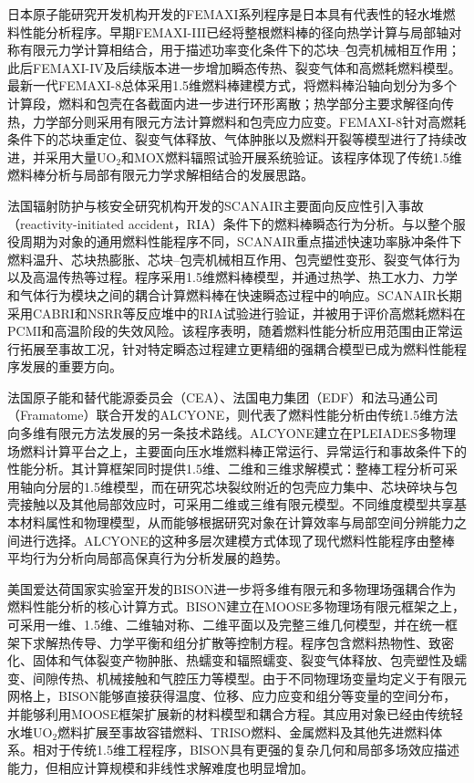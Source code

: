 日本原子能研究开发机构开发的FEMAXI系列程序是日本具有代表性的轻水堆燃料性能分析程序。早期FEMAXI-III已经将整根燃料棒的径向热学计算与局部轴对称有限元力学计算相结合，用于描述功率变化条件下的芯块--包壳机械相互作用；此后FEMAXI-IV及后续版本进一步增加瞬态传热、裂变气体和高燃耗燃料模型。最新一代FEMAXI-8总体采用1.5维燃料棒建模方式，将燃料棒沿轴向划分为多个计算段，燃料和包壳在各截面内进一步进行环形离散；热学部分主要求解径向传热，力学部分则采用有限元方法计算燃料和包壳应力应变\cite{udagawaModelUpdatesFEMAXI2019}。FEMAXI-8针对高燃耗条件下的芯块重定位、裂变气体释放、气体肿胀以及燃料开裂等模型进行了持续改进，并采用大量UO$_2$和MOX燃料辐照试验开展系统验证。该程序体现了传统1.5维燃料棒分析与局部有限元力学求解相结合的发展思路。

法国辐射防护与核安全研究机构开发的SCANAIR主要面向反应性引入事故（re\-ac\-tiv\-i\-ty-initiated accident，RIA）条件下的燃料棒瞬态行为分析。与以整个服役周期为对象的通用燃料性能程序不同，SCANAIR重点描述快速功率脉冲条件下燃料温升、芯块热膨胀、芯块--包壳机械相互作用、包壳塑性变形、裂变气体行为以及高温传热等过程。程序采用1.5维燃料棒模型，并通过热学、热工水力、力学和气体行为模块之间的耦合计算燃料棒在快速瞬态过程中的响应\cite{moalSCANAIRTransientFuel2014}。SCANAIR长期采用CABRI和NSRR等反应堆中的RIA试验进行验证，并被用于评价高燃耗燃料在PCMI和高温阶段的失效风险。该程序表明，随着燃料性能分析应用范围由正常运行拓展至事故工况，针对特定瞬态过程建立更精细的强耦合模型已成为燃料性能程序发展的重要方向。

法国原子能和替代能源委员会（CEA）、法国电力集团（EDF）和法马通公司（Framatome）联合开发的ALCYONE，则代表了燃料性能分析由传统1.5维方法向多维有限元方法发展的另一条技术路线。ALCYONE建立在PLEIADES多物理场燃料计算平台之上，主要面向压水堆燃料棒正常运行、异常运行和事故条件下的性能分析\cite{introiniALCYONEFuelPerformance2024}。其计算框架同时提供1.5维、二维和三维求解模式：整棒工程分析可采用轴向分层的1.5维模型，而在研究芯块裂纹附近的包壳应力集中、芯块碎块与包壳接触以及其他局部效应时，可采用二维或三维有限元模型。不同维度模型共享基本材料属性和物理模型，从而能够根据研究对象在计算效率与局部空间分辨能力之间进行选择。ALCYONE的这种多层次建模方式体现了现代燃料性能程序由整棒平均行为分析向局部高保真行为分析发展的趋势。

美国爱达荷国家实验室开发的BISON进一步将多维有限元和多物理场强耦合作为燃料性能分析的核心计算方式。BISON建立在MOOSE多物理场有限元框架之上，可采用一维、1.5维、二维轴对称、二维平面以及完整三维几何模型，并在统一框架下求解热传导、力学平衡和组分扩散等控制方程\cite{williamsonBISONFlexibleCode2021}。程序包含燃料热物性、致密化、固体和气体裂变产物肿胀、热蠕变和辐照蠕变、裂变气体释放、包壳塑性及蠕变、间隙传热、机械接触和气腔压力等模型。由于不同物理场变量均定义于有限元网格上，BISON能够直接获得温度、位移、应力应变和组分等变量的空间分布，并能够利用MOOSE框架扩展新的材料模型和耦合方程。其应用对象已经由传统轻水堆UO$_2$燃料扩展至事故容错燃料、TRISO燃料、金属燃料及其他先进燃料体系。相对于传统1.5维工程程序，BISON具有更强的复杂几何和局部多场效应描述能力，但相应计算规模和非线性求解难度也明显增加。

